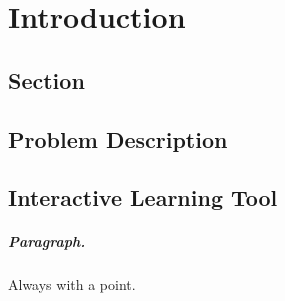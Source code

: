 \chapter{Introduction}
\section{Section}
\section{Problem Description}

\section{Interactive Learning Tool}

\paragraph{Paragraph.} Always with a point.


